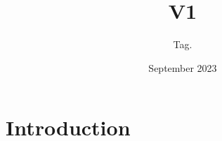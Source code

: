 \documentclass{article}
\title{V1}
\author{Tag. }
\date{September 2023}
\begin{document}
\maketitle

\section{Introduction}
\end{document}
